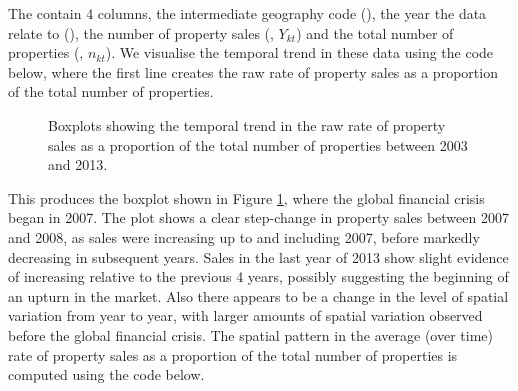 \documentclass[article, nojss]{jss}
\begin{document}
The   contain 4 columns, the intermediate geography code (), the year the data relate to (), the number of property sales (, $Y_{kt}$) and the total number of properties (, $n_{kt}$). We visualise the temporal trend in these data using the code below, where the first line creates the raw rate of property sales as a proportion of the total number of properties.

\begin{Schunk}
\end{Schunk}


\begin{figure}
\centering 
{}
\caption{Boxplots showing the temporal trend in the raw rate of property sales as a proportion of the total number of properties between 2003 and 2013.\label{salesboxplot}}
\end{figure} 


This produces the boxplot shown in Figure \ref{salesboxplot}, where the global financial crisis began in 2007. The plot shows a clear step-change in property sales between 2007 and 2008, as sales were increasing up to and including 2007, before markedly decreasing in subsequent years. Sales in the last year of 2013 show slight evidence of increasing relative to the previous 4 years, possibly suggesting the beginning of an upturn in the market. Also there appears to be a change in the level of spatial variation from year to year, with larger amounts of spatial variation observed before the global financial crisis. The spatial pattern in the average (over time) rate of property sales as a proportion of the total number of properties is computed using the code below.
\end{document}
